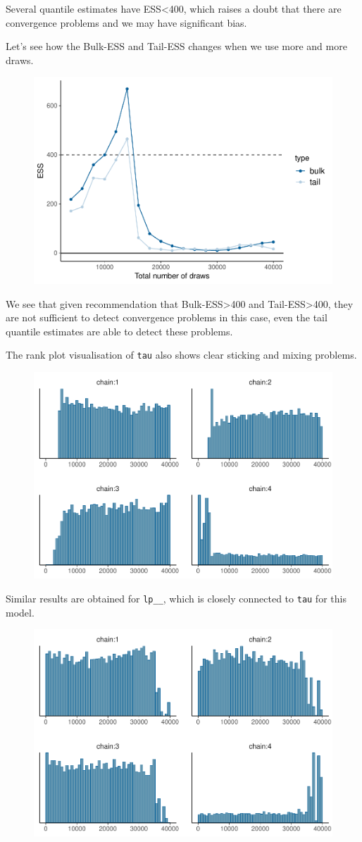 \documentclass[american,]{article}
\begin{document}
Several quantile estimates have ESS\textless{}400, which raises a doubt
that there are convergence problems and we may have significant bias.

Let's see how the Bulk-ESS and Tail-ESS changes when we use more and
more draws.

\begin{figure}[t]
  \centering
  \includegraphics[width=0.6\linewidth]{graphics/change-ess-fit-cp2-tau-1.pdf}
\end{figure}

We see that given recommendation that Bulk-ESS\textgreater{}400 and
Tail-ESS\textgreater{}400, they are not sufficient to detect convergence
problems in this case, even the tail quantile estimates are able to
detect these problems.

The rank plot visualisation of \texttt{tau} also shows clear sticking
and mixing problems.

\begin{figure}[t]
  \centering
  \includegraphics[width=0.6\linewidth]{graphics/hist-fit-cp2-tau-1.pdf}
\end{figure}

Similar results are obtained for \texttt{lp\_\_}, which is closely
connected to \texttt{tau} for this model.

\begin{figure}[t]
  \centering
  \includegraphics[width=0.6\linewidth]{graphics/hist-fit-cp2-lp-1.pdf}
\end{figure}
\end{document}
